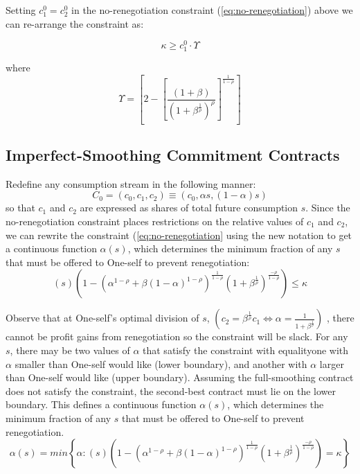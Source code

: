 \documentclass[11pt,english]{article}
\theoremstyle{plain}
\theoremstyle{definition}
\begin{document}
Setting $c_{1}^{0}=c_{2}^{0}$ in the no-renegotiation constraint
(\ref{eq:no-renegotiation}) above we can re-arrange the constraint
as: 

\begin{equation}
\kappa\geq c_{1}^{0}\cdotp\Upsilon\label{eq:smoothing-no-renegotiation}
\end{equation}

where 
\begin{equation}
\Upsilon=\left[2-\left[\frac{(1+\beta)}{\left(1+\beta^{\frac{1}{\rho}}\right)^{\rho}}\right]^{\frac{1}{1-\rho}}\right]\label{eq:upsilon}
\end{equation}


\subsection{Imperfect-Smoothing Commitment Contracts}

Redefine any consumption stream in the following manner: 
\begin{equation}
C_{0}=\left(c_{0},c_{1},c_{2}\right)\equiv\left(c_{0},\alpha s,\left(1-\alpha\right)s\right)\label{eq:new-notation}
\end{equation}
so that $c_{1}$ and $c_{2}$ are expressed as shares of total future
consumption $s$. Since the no-renegotiation constraint places restrictions
on the relative values of $c_{1}$ and $c_{2}$, we can rewrite the
constraint (\ref{eq:no-renegotiation} using the new notation to get
a continuous function $\alpha\left(s\right)$, which determines the
minimum fraction of any $s$ that must be offered to One-self to prevent
renegotiation: 
\begin{equation}
\left(s\right)\left(1-\left(\alpha^{1-\rho}+\beta\left(1-\alpha\right)^{1-\rho}\right)^{\frac{1}{1-\rho}}\left(1+\beta^{\frac{1}{\rho}}\right)^{\frac{-\rho}{1-\rho}}\right)\leq\kappa\label{eq:no-renegotiation-alpha-s}
\end{equation}

Observe that at One-self's optimal division of $s$, $\left(c_{2}=\beta^{\frac{1}{\rho}}c_{1}\Longleftrightarrow\alpha=\frac{1}{1+\beta^{\frac{1}{\rho}}}\right)$
, there cannot be profit gains from renegotiation so the constraint
will be slack. For any $s$, there may be two values of $\alpha$
that satisfy the constraint with equality\textendash one with $\alpha$
smaller than One-self would like (lower boundary), and another with
$\alpha$ larger than One-self would like (upper boundary). Assuming
the full-smoothing contract does not satisfy the constraint, the second-best
contract must lie on the lower boundary. This defines a continuous
function $\alpha\left(s\right)$, which determines the minimum fraction
of any $s$ that must be offered to One-self to prevent renegotiation.
\begin{equation}
\alpha\left(s\right)=min\left\{ \alpha:\left(s\right)\left(1-\left(\alpha^{1-\rho}+\beta\left(1-\alpha\right)^{1-\rho}\right)^{\frac{1}{1-\rho}}\left(1+\beta^{\frac{1}{\rho}}\right)^{\frac{-\rho}{1-\rho}}\right)=\kappa\right\} \label{eq:alpha-1}
\end{equation}
\end{document}
